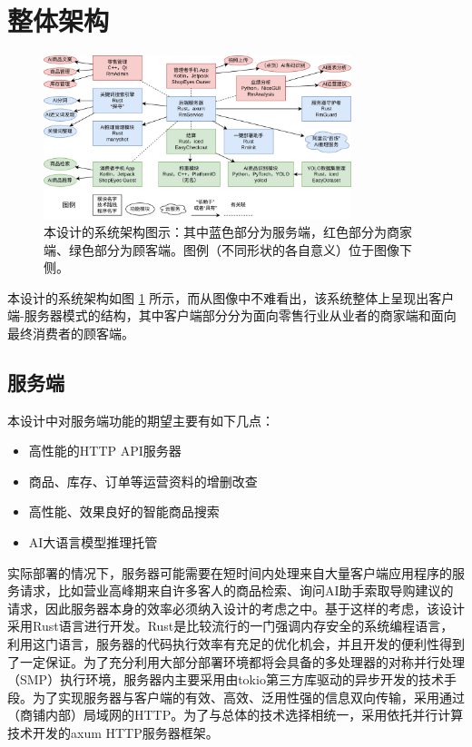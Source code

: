 \newpage
\section{整体架构}
\label{sec:architecture}

\begin{figure}[htbp]
	\centering
	\includegraphics[width=0.8\textwidth]{./imgs/structure2.png}
	\caption{本设计的系统架构图示：其中蓝色部分为服务端，红色部分为商家端、绿色部分为顾客端。图例（不同形状的各自意义）位于图像下侧。}
	\label{fig:structure2}
\end{figure}

本设计的系统架构如图 \ref{fig:structure2} 所示，而从图像中不难看出，该系统整体上呈现出客户端-服务器模式的结构，其中客户端部分分为面向零售行业从业者的商家端和面向最终消费者的顾客端。

\subsection{服务端}

本设计中对服务端功能的期望主要有如下几点：

\begin{itemize}
    \item 高性能的HTTP API服务器
    \item 商品、库存、订单等运营资料的增删改查
    \item 高性能、效果良好的智能商品搜索
    \item AI大语言模型推理托管
\end{itemize}

实际部署的情况下，服务器可能需要在短时间内处理来自大量客户端应用程序的服务请求，比如营业高峰期来自许多客人的商品检索、询问AI助手索取导购建议的请求，因此服务器本身的效率必须纳入设计的考虑之中。基于这样的考虑，该设计采用Rust语言进行开发。Rust是比较流行的一门强调内存安全的系统编程语言，利用这门语言，服务器的代码执行效率有充足的优化机会，并且开发的便利性得到了一定保证。为了充分利用大部分部署环境都将会具备的多处理器的对称并行处理（SMP）执行环境，服务器内主要采用由tokio第三方库驱动的异步开发的技术手段。为了实现服务器与客户端的有效、高效、泛用性强的信息双向传输，采用通过（商铺内部）局域网的HTTP。为了与总体的技术选择相统一，采用依托并行计算技术开发的axum HTTP服务器框架。

